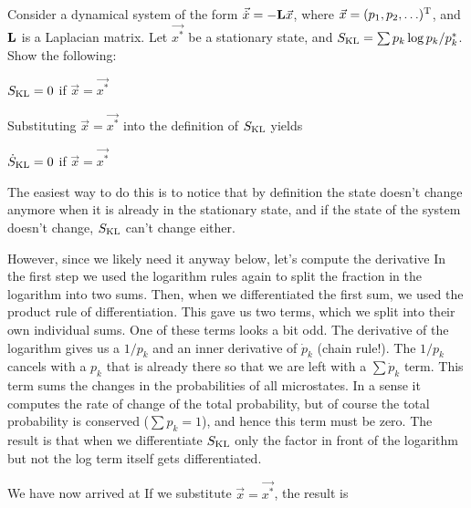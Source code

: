 Consider a dynamical system of the form $\vec{\dot{x}}=-{\bf L}\vec{x}$, where $\vec{x}=(p_1,p_2,\ldots)^{\rm T}$, and $\bf L$ is a Laplacian matrix. Let $\vec{x^*}$ be a stationary state, and $S_{\rm KL}=\sum p_k \log p_k/p_k^*$. Show the following:

\subquestion $S_{\rm KL}=0$  if $\vec{x}=\vec{x^*}$

\solution
Substituting $\vec{x}=\vec{x^*}$ into the definition of $S_{\rm KL}$ yields 

\subquestion $\dot{S}_{\rm KL}=0$ if $\vec{x}=\vec{x^*}$

\solution 
The easiest way to do this is to notice that by definition the state doesn't change anymore when it is already in the stationary state, and if the state of the system doesn't change, $S_{\rm KL}$ can't change either. 

However, since we likely need it anyway below, let's compute the derivative
In the first step we used the logarithm rules again to split the fraction in the logarithm into two sums. Then, when we differentiated the first sum, we used the product rule of differentiation. This gave us two terms, which we split into their own individual sums. One of these terms looks a bit odd. The derivative of the logarithm gives us a $1/p_k$ and an inner derivative of $\dot{p}_k$ (chain rule!). The $1/p_k$ cancels with a $p_k$ that is already there so that we are left with a $\sum \dot{p}_k$ term. This term sums the changes in the probabilities of all microstates. In a sense it computes the rate of change of the total probability, but of course the total probability is conserved ($\sum p_k=1$), and hence this term must be zero. The result is that when we differentiate $S_{\rm KL}$ only the factor in front of the logarithm but not the log term itself gets differentiated.

We have now arrived at 
If we substitute $\vec{x}=\vec{x^*}$, the result is

